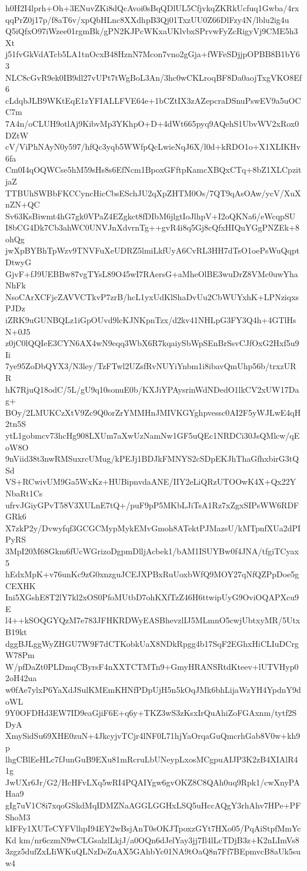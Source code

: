 h0H2I4lprh+Oh+3ENuvZKi8dQcAvoi0sBqQDlUL5CfjvkqZKRkUcfuq1Gwba/4rx
qqPrZ0j17p/f8aT6v/xpQbHLnc8XXdhpB3Qj01TxzUU0Z66DlFzy4N/lblu2ig4u
Q5iQfxO97iWzee01rgmBk/gPN2KJPcWKxaUKlvbxSPrvwFyZcRigyVj9CME5h3Xt
j51fvGkVdATcb5LA1tnOcxB48HznN7Mcon7vno2gGja+fWFeSDjjpOPBB8B1bY63
NLC8cGvR9ek0IB9dl27vUPt7tWgBoL3An/3hc0wCKLroqBF8Da0aojTxgVKO8Ef6
cLdqbJLB9WKtEqE1zYFIALLFVE64e+1bCZtIX3zAZepcraDSnuPswEV9a5uOCC7m
7A4n/oCLUH9otlAj9KibvMp3YKhpO+D+4dWt665pyq9AQehS1UbvWV2xRox0DZtW
cV/ViPhNAyN0y597/hfQc3yqb5WWfpQcLwieNqJ6X/l0d+kRDO1o+X1XLIKHv6fa
Cm0I4qOQWCse5hM59sHs8s6EfNcm1BpoxGFftpKamcXBQxCTq+8bZ1XLCpzitjaZ
TTBUhSWBbFKCCyncHicCbsESchJU2qXpZHTM0Os/7QT9qAsOAw/ycV/XuXnZN+QC
Sv63KsBiwmt4hG7gk0VPaZ4EZgkct8fDIbM6jlgtIoJlhpV+I2oQKNa6/eWcqpSU
I8bCG4Dk7Cb3ahWC0UNVJnXdvrnTg++gvR4i8q5Gj8cQfxHIQuYGgPNZEk+8ohQg
jwXpBYBhTpWzv9TNVFuXeUDRZ5lmiLkfUyA6CvRL3HH7dTsO1oePsWuQqptDtwyG
GjvF+fJ9UEBBw87vgTYsL89O45wI7RAersG+aMheOlBE3wuDrZ8VMc0uwYhaNhFk
NsoCArXCFjcZAVVCTkvP7zrB/hcL1yxUdKlShaDvUu2CbWUYxhK+LPNziqxsPJDz
iZRK9uGUNBQLz1iGpOUvd9lcKJNKpnTzx/d2kv41NHLpG3FY3Q4h+4GTlHsN+0J5
z0jC0lQQIeE3CYN6AX4wN9eqq3WbX6R7kqaiySbWpSEnBrSsvCJfOxG2Hxf5u9Ii
7ye95ZoDbQYX3/N3ley/TzFTwl2UZsfRvNUYiYnbm1i8ibavQmUhp56b/trxzURR
hK7RjuQ18odC/5L/gU9q10sonuE0b/KXJiYPAysrinWdNDedO1lkCV2xUW17Dag+
BOy/2LMUKCzXtV9Zc9Q0orZrYMMHnJMIVKGYghpvessc0AI2F5yWJLwE4qH2tn5S
ytL1gobmcv73hcHg908LXUm7aXwUzNamNw1GF5uQEc1NRDCi30JsQMlcw/qEoW8O
9nViid38t3nwRMSuxrcUMug/kPEJj1BDJkFMNYS2cSDpEKJhThaGfhxbirG3tQSd
VS+RCwivUM9Ga5WxKz+HUBipnvdaANE/IIY2eLiQRzUTOOwK4X+Qx22YNbaRt1Cs
ufrvJGiyGPvT58V3XULnE7tQ+/puF9pP5MKbLJiTsA1Rz7xZgxSIPsWW6RDFGRk6
X7zkP2y/Dvwyfqf3GCGCMypMykEMvGmoh8ATektPJMazsU/kMTpnfXUa2dPIPyRS
3MpI20M68Gkm6fUcWGrizoDgpmDlljAcbek1/bAM1ISUYBw0f4JNA/tfgiTCyax5
hEdxMpK+v76unKc9zG0xnzguJCEJXPBxRuUoxbWfQ9MOY27qNfQZPpDoe5gCEXHK
Ini5XGshE8T2lY7kl2xOS0PfoMUtbD7ohKXfTzZ46H6ttwipUyG9OviOQAPXcu9E
l4++kSOQGYQzM7e783JFHKRDWyEASBhevzlIJ5MLmnO5cwjUbtxyMR/5UtxB19kt
dggBJLggWyZHGU7W9F7dCTKobkUaX8NDkRpgg4b17SqF2EGhxHiCLIuDCrgW78Pm
W/pfDaZt0PLDmqCByrsF4nXXTCTMTn9+GmyHRANSRtdKteev+lUTVHyp02oH42ua
w0fAe7ylxP6YaXdJSulKMEmKHNfPDpUjH5n5kOqJMk6bhLijaWzYH4YpdnY9doWL
9Y0OFDHd3EW7ID9eaGjiF6E+q6y+TKZ3wS3zKsxIrQuAhiZoFGAxnm/tytf2SDyA
XmySidSu69XHE0zuN+4JkcyjvTCjr4lNF0L71hjYaOrqaGuQmcrhGab8V0w+kh9p
lhgCBlEeHLc7fJunGuB9EXu81mRcruLbUNeypLxosMCgpuAIJP3K2zB4XIAlR41g
JwUXr6Jr/G2/HcHFvLXq5wRI4PQAIYgw6gvOKZ8C8QAh0uq9Rpk1/cwXnyPAHaa9
gIg7uV1C8i7xqoGSkdMqIDMZNaAGGLGGHxLSQ5uHccAQgY3rhAhv7HPe+PFShoM3
kIFFy1XUTeCYFVlhpI94EY2wBsjAnT0sOKJTpoxzGYt7HXo05/PqAiStpfMmYcKd
km/nr6czmN9wCLGsalzlLkjJ/a0OQn6dJelYay3jj7Il4lLcTDjB3z+K2nLImVs8
3zgz5dufZxLIiWKuQLNzDeZuAX5GAhbYc01NA9tOaQ8n7Ff7BEpmvcB8aUk5suw4
